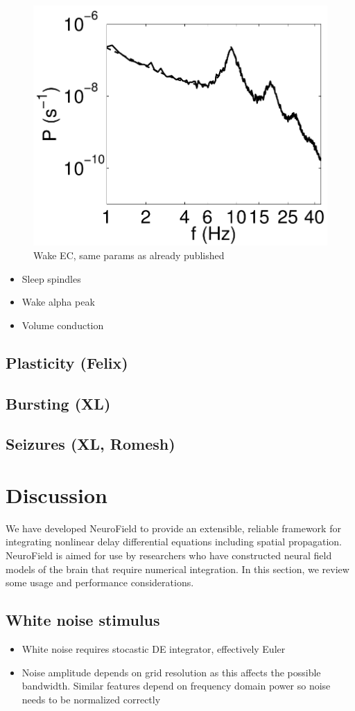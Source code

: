 \documentclass[preprint,review,10pt,authoryear,letterpaper]{elsarticle}
\begin{document}
\begin{figure}[!b]
\begin{center}
\includegraphics[width=0.40\columnwidth]{corticothalamic_comparison}
\caption{Wake EC, same params as already published}
\label{fig:ct_spectrum}
\end{center}
\end{figure}


\begin{itemize}
	\item Sleep spindles
	\item Wake alpha peak
	\item Volume conduction
\end{itemize}

\subsection{Plasticity (Felix)}

\subsection{Bursting (XL)}

\subsection{Seizures (XL, Romesh)}

\section{Discussion}
\label{sec:discussion}

We have developed NeuroField to provide an extensible, reliable framework for integrating nonlinear delay differential equations including spatial propagation. NeuroField is aimed for use by researchers who have constructed neural field models of the brain that require numerical integration. In this section, we review some usage and performance considerations.

\subsection{White noise stimulus}
\begin{itemize}
	\item White noise requires stocastic DE integrator, effectively Euler
	\item Noise amplitude depends on grid resolution as this affects the possible bandwidth. Similar features depend on frequency domain power so noise needs to be normalized correctly
\end{itemize}
\end{document}
